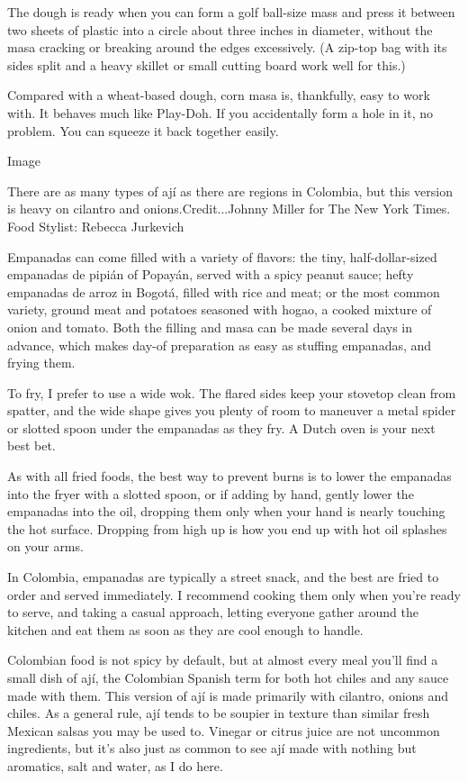The dough is ready when you can form a golf ball-size mass and press it
between two sheets of plastic into a circle about three inches in
diameter, without the masa cracking or breaking around the edges
excessively. (A zip-top bag with its sides split and a heavy skillet or
small cutting board work well for this.)

Compared with a wheat-based dough, corn masa is, thankfully, easy to
work with. It behaves much like Play-Doh. If you accidentally form a
hole in it, no problem. You can squeeze it back together easily.

Image

There are as many types of ají as there are regions in Colombia, but
this version is heavy on cilantro and onions.Credit...Johnny Miller for
The New York Times. Food Stylist: Rebecca Jurkevich

Empanadas can come filled with a variety of flavors: the tiny,
half-dollar-sized empanadas de pipián of Popayán, served with a spicy
peanut sauce; hefty empanadas de arroz in Bogotá, filled with rice and
meat; or the most common variety, ground meat and potatoes seasoned with
hogao, a cooked mixture of onion and tomato. Both the filling and masa
can be made several days in advance, which makes day-of preparation as
easy as stuffing empanadas, and frying them.

To fry, I prefer to use a wide wok. The flared sides keep your stovetop
clean from spatter, and the wide shape gives you plenty of room to
maneuver a metal spider or slotted spoon under the empanadas as they
fry. A Dutch oven is your next best bet.

As with all fried foods, the best way to prevent burns is to lower the
empanadas into the fryer with a slotted spoon, or if adding by hand,
gently lower the empanadas into the oil, dropping them only when your
hand is nearly touching the hot surface. Dropping from high up is how
you end up with hot oil splashes on your arms.

In Colombia, empanadas are typically a street snack, and the best are
fried to order and served immediately. I recommend cooking them only
when you're ready to serve, and taking a casual approach, letting
everyone gather around the kitchen and eat them as soon as they are cool
enough to handle.

Colombian food is not spicy by default, but at almost every meal you'll
find a small dish of ají, the Colombian Spanish term for both hot chiles
and any sauce made with them. This version of ají is made primarily with
cilantro, onions and chiles. As a general rule, ají tends to be soupier
in texture than similar fresh Mexican salsas you may be used to. Vinegar
or citrus juice are not uncommon ingredients, but it's also just as
common to see ají made with nothing but aromatics, salt and water, as I
do here.


